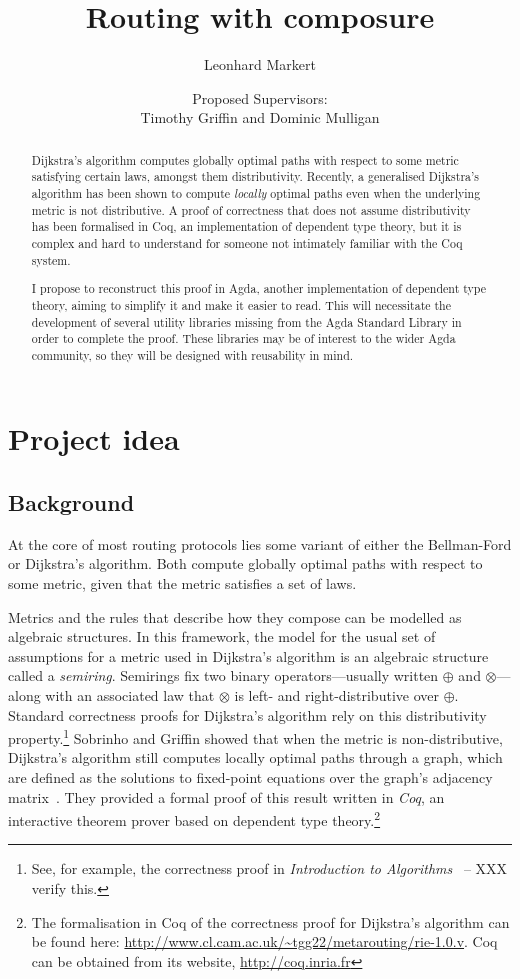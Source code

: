 \documentclass[a4paper]{article}
\title{Routing with composure}
\author{Leonhard Markert}
\date{Proposed Supervisors:\\Timothy Griffin and Dominic Mulligan}
\begin{document}
\maketitle

\begin{abstract}
Dijkstra's algorithm computes globally optimal paths with respect to some metric satisfying certain laws, amongst them distributivity. Recently, a generalised Dijkstra's algorithm has been shown to compute \emph{locally} optimal paths even when the underlying metric is not distributive. A proof of correctness that does not assume distributivity has been formalised in Coq, an implementation of dependent type theory, but it is complex and hard to understand for someone not intimately familiar with the Coq system.

I propose to reconstruct this proof in Agda, another implementation of dependent type theory, aiming to simplify it and make it easier to read. This will necessitate the development of several utility libraries missing from the Agda Standard Library in order to complete the proof. These libraries may be of interest to the wider Agda community, so they will be designed with reusability in mind.
\end{abstract}

\section{Project idea}
\label{introduction}

\subsection{Background}

At the core of most routing protocols lies some variant of either the Bellman-Ford or Dijkstra's algorithm.
Both compute globally optimal paths with respect to some metric, given that the metric satisfies a set of laws.

Metrics and the rules that describe how they compose can be modelled as algebraic structures.
In this framework, the model for the usual set of assumptions for a metric used in Dijkstra's algorithm is an algebraic structure called a \emph{semiring}.
Semirings fix two binary operators---usually written $\oplus$ and $\otimes$---along with an associated law that $\otimes$ is left- and right-distributive over $\oplus$.
Standard correctness proofs for Dijkstra's algorithm rely on this distributivity property.\footnote{See, for example, the correctness proof in \emph{Introduction to Algorithms}~\cite[XXX]{cormen_introduction_2009} -- XXX verify this.}
Sobrinho and Griffin showed that when the metric is non-distributive, Dijkstra's algorithm still computes locally optimal paths through a graph, which are defined as the solutions to fixed-point equations over the graph's adjacency matrix~\cite{sobrinho_routing_2010}.
They provided a formal proof of this result written in \emph{Coq}, an interactive theorem prover based on dependent type theory.\footnote{The formalisation in Coq of the correctness proof for Dijkstra's algorithm can be found here: \url{http://www.cl.cam.ac.uk/~tgg22/metarouting/rie-1.0.v}.
Coq can be obtained from its website, \url{http://coq.inria.fr}}
\end{document}
